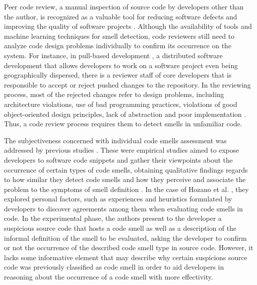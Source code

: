 Peer code review, a manual inspection of source code by developers other than the author, is recognized as a valuable tool for reducing software defects and improving the quality
of software projects \cite{bacchelli2013expectations}. Although the availability of tools \cite{fontana2012automatic} and machine learning techniques \cite{azeem2019machine} for smell detection, code reviewers still need to analyze code design problems individually to confirm its occurrence on the system. For instance, in pull-based development \cite{gousios2015work}, a distributed software development that allows developers to work on a software project even being geographically dispersed, there is a reviewer staff of core developers that is responsible to accept or reject pushed changes to the repository. In the reviewing process, most of the rejected changes refer to design problems, including architecture violations, use of bad programming practices, violations of good object-oriented design principles, lack of abstraction and poor implementation \cite{silva2016does}. Thus, a code review process requires them to detect smells in unfamiliar code. 

The subjectiveness concerned with individual code smells assessment was addressed by previous studies \cite{hozano2018you, palomba2014they, taibi2017developers}. These were empirical studies aimed to expose developers to software code snippets and gather their viewpoints about the occurrence of certain types of code smells, obtaining qualitative findings regards to how similar they detect code smells \cite{hozano2018you} and how they perceive and associate the problem to the symptoms of smell definition \cite{palomba2014they}. In the case of Hozano et al. \cite{hozano2018you}, they explored personal factors, such as experiences and heuristics formulated by developers to discover agreements among them when evaluating code smells in code. In the experimental phase, the authors present to the developer a suspicious source code that hosts a code smell as well as a description of the informal definition of the smell to be evaluated, asking the developer to confirm or not the occurrence of the described code smell type in source code. However, it lacks some informative element that may describe why certain suspicions source code was previously classified as code smell in order to aid developers in reasoning about the occurrence of a code smell with more effectivity.

